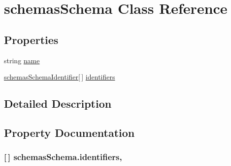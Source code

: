 \hypertarget{classschemas_schema}{}\section{schemas\+Schema Class Reference}
\label{classschemas_schema}


 


\subsection*{Properties}
\begin{DoxyCompactItemize}
\item 
string \hyperlink{classschemas_schema_ade6edd95fc90d8c67e0c0bfe34388a79}{name}
\item 
\hyperlink{classschemas_schema_identifier}{schemas\+Schema\+Identifier}\mbox{[}$\,$\mbox{]} \hyperlink{classschemas_schema_aa0f4c1fca6a4bc1a6e01d0f545a4a241}{identifiers}
\end{DoxyCompactItemize}


\subsection{Detailed Description}


\subsection{Property Documentation}
\subsubsection[{\texorpdfstring{identifiers}{identifiers}}]{ \mbox{[}$\,$\mbox{]} schemas\+Schema.\+identifiers\hspace{0.3cm}{\ttfamily [get]}, {\ttfamily [set]}}\hypertarget{classschemas_schema_aa0f4c1fca6a4bc1a6e01d0f545a4a241}{}\label{classschemas_schema_aa0f4c1fca6a4bc1a6e01d0f545a4a241}




